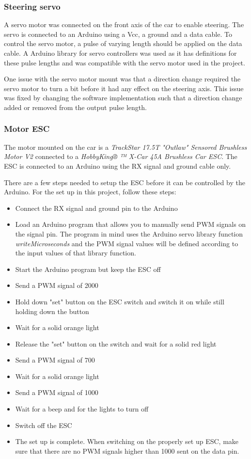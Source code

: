 \documentclass[11pt, titlepage]{article} %
\begin{document}
\subsubsection{Steering servo}
A servo motor was connected on the front axis of the car to enable steering. The servo is connected to an Arduino using a Vcc, a ground and a data cable. To control the servo motor, a pulse of varying length should be applied on the data cable. A Arduino library for servo controllers was used as it has definitions for these pulse lengths and was compatible with the servo motor used in the project.

One issue with the servo motor mount was that a direction change required the servo motor to turn a bit before it had any effect on the steering axis. This issue was fixed by changing the software implementation such that a direction change added or removed from the output pulse length.

\subsubsection{Motor ESC}
The motor mounted on the car is a \textit{TrackStar 17.5T "Outlaw" Sensored Brushless Motor V2} connected to a \textit{HobbyKing® ™ X-Car 45A Brushless Car ESC}. The ESC is connected to an Arduino using the RX signal and ground cable only.

There are a few steps needed to setup the ESC before it can be controlled by the Arduino. For the set up in this project, follow these steps:
\begin{itemize}
	\item Connect the RX signal and ground pin to the Arduino
	\item Load an Arduino program that allows you to manually send PWM signals on the signal pin. The program in mind uses the Arduino servo library function \textit{writeMicroseconds} and the PWM signal values will be defined according to the input values of that library function.
	\item Start the Arduino program but keep the ESC off
	\item Send a PWM signal of 2000
	\item Hold down "set" button on the ESC switch and switch it on while still holding down the button
	\item Wait for a solid orange light
	\item Release the "set" button on the switch and wait for a solid red light
	\item Send a PWM signal of 700
	\item Wait for a solid orange light
	\item Send a PWM signal of 1000
	\item Wait for a beep and for the lights to turn off
	\item Switch off the ESC
	\item The set up is complete. When switching on the properly set up ESC, make sure that there are no PWM signals higher than 1000 sent on the data pin.
\end{itemize}
\end{document}
